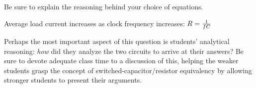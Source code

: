 Be sure to explain the reasoning behind your choice of equations.







Average load current increases as clock frequency increases: $R = {1 \over fC}$







Perhaps the most important aspect of this question is students' analytical reasoning: {\it how} did they analyze the two circuits to arrive at their answers?  Be sure to devote adequate class time to a discussion of this, helping the weaker students grasp the concept of switched-capacitor/resistor equivalency by allowing stronger students to present their arguments.




